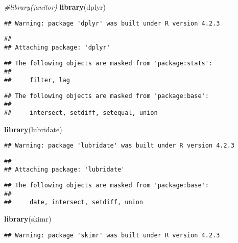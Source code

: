 \documentclass[
]{article}
\newenvironment{Shaded}{\begin{snugshade}}{\end{snugshade}}
\newcommand{\CommentTok}[1]{\textcolor[rgb]{0.56,0.35,0.01}{\textit{#1}}}
\newcommand{\FunctionTok}[1]{\textcolor[rgb]{0.13,0.29,0.53}{\textbf{#1}}}
\newcommand{\NormalTok}[1]{#1}
\begin{document}
\begin{Shaded}
\begin{Highlighting}[]
\CommentTok{\#library(janitor)}
\FunctionTok{library}\NormalTok{(dplyr)}
\end{Highlighting}
\end{Shaded}

\begin{verbatim}
## Warning: package 'dplyr' was built under R version 4.2.3
\end{verbatim}

\begin{verbatim}
## 
## Attaching package: 'dplyr'
\end{verbatim}

\begin{verbatim}
## The following objects are masked from 'package:stats':
## 
##     filter, lag
\end{verbatim}

\begin{verbatim}
## The following objects are masked from 'package:base':
## 
##     intersect, setdiff, setequal, union
\end{verbatim}

\begin{Shaded}
\begin{Highlighting}[]
\FunctionTok{library}\NormalTok{(lubridate)}
\end{Highlighting}
\end{Shaded}

\begin{verbatim}
## Warning: package 'lubridate' was built under R version 4.2.3
\end{verbatim}

\begin{verbatim}
## 
## Attaching package: 'lubridate'
\end{verbatim}

\begin{verbatim}
## The following objects are masked from 'package:base':
## 
##     date, intersect, setdiff, union
\end{verbatim}

\begin{Shaded}
\begin{Highlighting}[]
\FunctionTok{library}\NormalTok{(skimr)}
\end{Highlighting}
\end{Shaded}

\begin{verbatim}
## Warning: package 'skimr' was built under R version 4.2.3
\end{verbatim}
\end{document}
